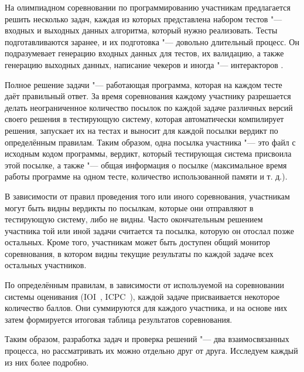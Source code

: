 На олимпиадном соревновании по программированию участникам предлагается решить несколько задач, каждая из которых представлена набором тестов "--- входных и выходных данных алгоритма, который нужно реализовать. Тесты подготавливаются заранее, и их подготовка "--- довольно длительный процесс. Он подразумевает генерацию входных данных для тестов, их валидацию, а также генерацию выходных данных, написание чекеров и иногда "--- интеракторов \cite{testlib}.

Полное решение задачи "--- работающая программа, которая на каждом тесте даёт правильный ответ. За время соревнования каждому участнику разрешается делать неограниченное количество посылок по каждой задаче различных версий своего решения в тестирующую систему, которая автоматически компилирует решения, запускает их на тестах и выносит для каждой посылки вердикт по определённым правилам. Таким образом, одна посылка участника "--- это файл с исходным кодом программы, вердикт, который тестирующая система присвоила этой посылке, а также "--- общая информация о посылке (максимальное время работы программе на одном тесте, количество использованной памяти и т. д.).

В зависимости от правил проведения того или иного соревнования, участникам могут быть видны вердикты по посылкам, которые они отправляют в тестирующую систему, либо не видны. Часто окончательным решением участника той или иной задачи считается та посылка, которую он отослал позже остальных. Кроме того, участникам может быть доступен общий монитор соревнования, в котором видны текущие результаты по каждой задаче всех остальных участников.

По определённым правилам, в зависимости от используемой на соревновании системы оценивания (IOI~\cite{ioi}, ICPC~\cite{icpc}), каждой задаче присваивается некоторое количество баллов. Они суммируются для каждого участника, и на основе них затем формируется итоговая таблица результатов соревнования.

Таким образом, разработка задач и проверка решений "--- два взаимосвязанных процесса, но рассматривать их можно отдельно друг от друга. Исследуем каждый из них более подробно.